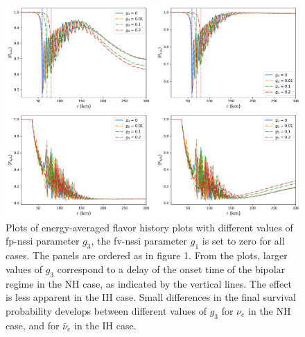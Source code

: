 \documentclass[11pt, oneside]{article}   	%
\begin{document}
\begin{figure}[t]
\begin{center}
\includegraphics[width=\linewidth]{flavor_evo_fp.png}
\caption{Plots of energy-averaged flavor history plots with different values of fp-nssi parameter $g_3$, the fv-nssi parameter $g_1$ is set to zero for all cases. The panels are ordered as in figure 1. From the plots, larger values of $g_3$ correspond to a delay of the onset time of the bipolar regime in the NH case, as indicated by the vertical lines. The effect is less apparent in the IH case. Small differences in the final survival probability develops between different values of $g_3$ for $\nu_e$ in the NH case, and for $\bar \nu_e$ in the IH case.}
\label{fig:fe_fp}
\end{center}
\end{figure}
\end{document}
